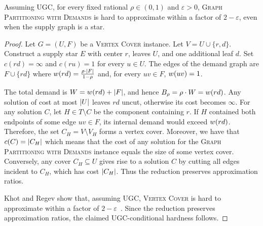 \begin{theorem}\label{thm:tree-gpd-vertex-cover-hardness}
Assuming UGC, for every fixed rational $\rho\in(0,1)$ and $\varepsilon>0$, \textsc{Graph Partitioning with Demands} is hard to approximate within a factor of $2-\varepsilon$, even when the supply graph is a star.
\end{theorem}
\begin{proof}
Let $G=(U,F)$ be a \textsc{Vertex Cover} instance. Let $V=U\cup\{r,d\}$. Construct a supply star $E$ with center $r$, leaves $U$, and one additional leaf $d$. Set $c(rd)=\infty$ and $c(ru)=1$ for every $u\in U$. The edges of the demand graph are $F\cup\{rd\}$ where $w\mathopen{}\left( rd \right)=\frac{\rho \cdot \mathopen{}\left| F \right|}{1-\rho}$ and, for every $uv\in F$, $w\mathopen{}\left( uv \right)=1$.

The total demand is $W=w\mathopen{}\left( rd \right)+\mathopen{}\left| F \right|$, and hence $B_\rho=\rho\cdot W=w\mathopen{}\left( rd \right)$. Any solution of cost at most $\mathopen{}\left| U \right|$ leaves $rd$ uncut, otherwise its cost becomes $\infty$. For any solution $C$, let $H\in T\setminus C$ be the component containing $r$. If $H$ contained both endpoints of some edge $uv\in F$, its internal demand would exceed $w\mathopen{}\left( rd \right)$. Therefore, the set $C_H=V\setminus V_H$ forms a vertex cover. Moreover, we have that $c\mathopen{}\left( C \right)=\mathopen{}\left| C_H \right|$ which means that the cost of any solution for the \textsc{Graph Partitioning with Demands} instance equals the size of some vertex cover. Conversely, any cover $C_H\subseteq U$ gives rise to a solution $C$ by cutting all edges incident to $C_H$, which has cost $\mathopen{}\left| C_H \right|$. Thus the reduction preserves approximation ratios.

Khot and Regev show that, assuming UGC, \textsc{Vertex Cover} is hard to approximate within a factor of $2-\varepsilon$~\cite{VertexCoverMightBeHardToApproximateToWithin2MinusEpsilon}. Since the reduction preserves approximation ratios, the claimed UGC-conditional hardness follows.
\end{proof}

